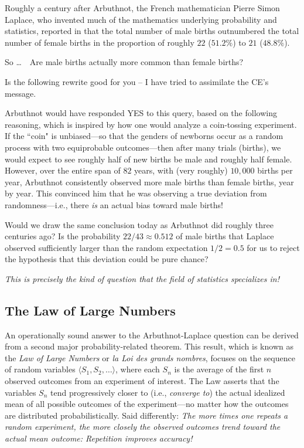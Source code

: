 \smallskip

Roughly a century after Arbuthnot, the French mathematician Pierre Simon Laplace, who invented much of the mathematics underlying probability and statistics, reported in \cite{Laplace} that the total number of male births outnumbered the total number of female births in the proportion of roughly $22$ ($51.2\%$) to $21$ ($48.8\%$).

\bigskip

\noindent
So \ldots \ \ Are male births actually more common than female births?

\bigskip

{\Arny Is the following rewrite good for you -- I have tried to assimilate the CE's message.}

\noindent
Arbuthnot would have responded YES to this query, based on the following reasoning, which is inspired by how one would analyze a coin-tossing experiment.  If the ``coin" is unbiased---so that  the genders of newborns occur as a random process with two equiprobable outcomes---then after many trials (births), we would expect to see roughly half of new births be male and roughly half female.  However, over the entire span of $82$ years, with (very roughly) $10,000$ births per year, Arbuthnot consistently observed more male births than female births, year by year.  This convinced him that he was observing a true deviation from randomness---i.e., there {\em is} an actual bias toward male births!

\medskip

Would we draw the same conclusion today as Arbuthnot did roughly three centuries ago?  Is the probability $22/43 \approx 0.512$ of male births that Laplace observed sufficiently larger than the random expectation $1/2 = 0.5$ for us to reject the hypothesis that this deviation could be pure chance?

\medskip

{\em This is precisely the kind of question that the field of statistics specializes in!}

\subsection{The Law of Large Numbers}
\label{sec:Large-Numbers}

 

An operationally sound answer to the Arbuthnot-Laplace question can be derived from a second major probability-related theorem.  This result, which is known as the {\it Law of Large Numbers} or {\it la Loi des grands nombres}, focuses on the sequence of random variables $\langle S_1, S_2, \ldots \rangle$, where each $S_n$ is the average of the first $n$ observed outcomes from an experiment of interest.  The Law asserts that the variables $S_n$ tend progressively closer to (i.e., {\em converge to}) the actual idealized mean of all possible outcomes of the experiment---no matter how the outcomes are distributed probabilistically.  Said differently: {\em The more times one repeats a random experiment, the more closely the observed outcomes trend toward the actual mean outcome:  Repetition improves accuracy!}

